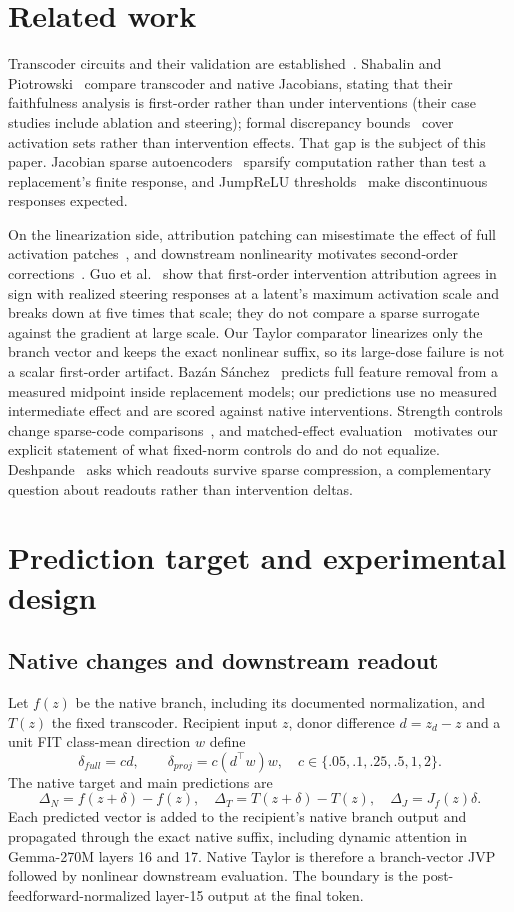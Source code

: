 \documentclass[11pt]{article}
\begin{document}
\section{Related work}
Transcoder circuits and their validation are established~\cite{dunefsky2024,ameisen2025}. Shabalin and Piotrowski~\cite{shabalin2026} compare transcoder and native Jacobians, stating that their faithfulness analysis is first-order rather than under interventions (their case studies include ablation and steering); formal discrepancy bounds~\cite{ladner2026} cover activation sets rather than intervention effects. That gap is the subject of this paper. Jacobian sparse autoencoders~\cite{farnik2025} sparsify computation rather than test a replacement's finite response, and JumpReLU thresholds~\cite{rajamanoharan2024} make discontinuous responses expected.

On the linearization side, attribution patching can misestimate the effect of full activation patches~\cite{syed2023}, and downstream nonlinearity motivates second-order corrections~\cite{zhangwang2026}. Guo et al.~\cite{guo2026} show that first-order intervention attribution agrees in sign with realized steering responses at a latent's maximum activation scale and breaks down at five times that scale; they do not compare a sparse surrogate against the gradient at large scale. Our Taylor comparator linearizes only the branch vector and keeps the exact nonlinear suffix, so its large-dose failure is not a scalar first-order artifact. Bazán Sánchez~\cite{bazan2026} predicts full feature removal from a measured midpoint inside replacement models; our predictions use no measured intermediate effect and are scored against native interventions. Strength controls change sparse-code comparisons~\cite{zhang2026}, and matched-effect evaluation~\cite{luo2026} motivates our explicit statement of what fixed-norm controls do and do not equalize. Deshpande~\cite{deshpande2026} asks which readouts survive sparse compression, a complementary question about readouts rather than intervention deltas.

\section{Prediction target and experimental design}
\subsection{Native changes and downstream readout}
Let $f(z)$ be the native branch, including its documented normalization, and $T(z)$ the fixed transcoder. Recipient input $z$, donor difference $d=z_d-z$ and a unit FIT class-mean direction $w$ define
\[
 \delta_{full}=cd,\qquad \delta_{proj}=c(d^\top w)w,
 \quad c\in\{.05,.1,.25,.5,1,2\}.
\]
The native target and main predictions are
\[
 \Delta_N=f(z+\delta)-f(z),\quad
 \Delta_T=T(z+\delta)-T(z),\quad
 \Delta_J=J_f(z)\delta.
\]
Each predicted vector is added to the recipient's native branch output and propagated through the exact native suffix, including dynamic attention in Gemma-270M layers 16 and 17. Native Taylor is therefore a branch-vector JVP followed by nonlinear downstream evaluation. The boundary is the post-feedforward-normalized layer-15 output at the final token.
\end{document}
